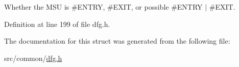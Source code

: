 Whether the M\-S\-U is \#\-E\-N\-T\-R\-Y, \#\-E\-X\-I\-T, or possible \#\-E\-N\-T\-R\-Y $\vert$ \#\-E\-X\-I\-T. 



Definition at line 199 of file dfg.\-h.



The documentation for this struct was generated from the following file\-:\begin{DoxyCompactItemize}
\item 
src/common/\hyperlink{dfg_8h}{dfg.\-h}\end{DoxyCompactItemize}
